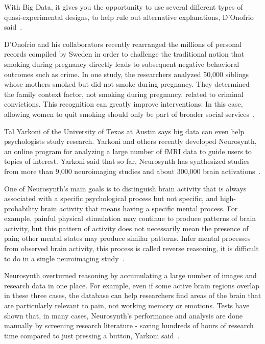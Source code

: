 With Big Data, it gives you the opportunity to use several different 
types of quasi-experimental designs, to help rule out alternative 
explanations, D’Onofrio said~\cite{editor00}.

D'Onofrio and his collaborators recently rearranged the millions of 
personal records compiled by Sweden in order to challenge the traditional 
notion that smoking during pregnancy directly leads to subsequent negative 
behavioral outcomes such as crime. In one study, the researchers analyzed 
50,000 siblings whose mothers smoked but did not smoke during pregnancy. 
They determined the family context factor, not smoking during pregnancy, 
related to criminal convictions. This recognition can greatly improve 
interventions: 
In this case, allowing women to quit smoking should only be part of 
broader social services~\cite{editor00}.

Tal Yarkoni of the University of Texas at Austin says big data can 
even help psychologists study research. Yarkoni and others recently 
developed Neurosynth, an online program for analyzing a large number 
of fMRI data to guide users to topics of interest. Yarkoni said that 
so far, Neurosynth has synthesized studies from more than 9,000 
neuroimaging studies and about 300,000 brain activations~\cite{editor00}.

One of Neurosynth's main goals is to distinguish brain activity that 
is always associated with a specific psychological process but not 
specific, and high-probability brain activity that means having a 
specific mental process. For example, painful physical stimulation 
may continue to produce patterns of brain activity, but this pattern 
of activity does not necessarily mean the presence of pain; other 
mental states may produce similar patterns. Infer mental processes 
from observed brain activity, this process is called reverse 
reasoning, it is difficult to do in a single neuroimaging 
study~\cite{editor00}.

Neurosynth overturned reasoning by accumulating a large number of 
images and research data in one place. For example, even if some 
active brain regions overlap in these three cases, the database can 
help researchers find areas of the brain that are particularly relevant 
to pain, not working memory or emotions. Tests have shown that, in many 
cases, Neurosynth's performance and analysis are done manually by 
screening research literature - saving hundreds of hours of research 
time compared to just pressing a button, Yarkoni said~\cite{editor00}.

